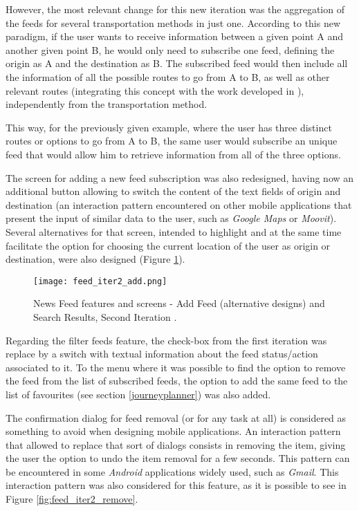 However, the most relevant change for this new iteration was the aggregation of the feeds for several transportation methods in just one. According to this new paradigm, if the user wants to receive information between a given point A and another given point B, he would only need to subscribe one feed, defining the origin as A and the destination as B. The subscribed feed would then include all the information of all the possible routes to go from A to B, as well as other relevant routes (integrating this concept with the work developed in \cite{kn:Dia13}), independently from the transportation method. 

This way, for the previously given example, where the user has three distinct routes or options to go from A to B, the same user would subscribe an unique feed that would allow him to retrieve information from all of the three options.

The screen for adding a new feed subscription was also redesigned, having now an additional button allowing to switch the content of the text fields of origin and destination (an interaction pattern encountered on other mobile applications that present the input of similar data to the user, such as \emph{Google Maps} or \emph{Moovit}).
Several alternatives for that screen, intended to highlight and at the same time facilitate the option for choosing the current location of the user as origin or destination, were also designed (Figure \ref{fig:feed_iter2_add}).

\begin{figure}[!h]
  \begin{center}
    \leavevmode
    \texttt{[image: feed\_iter2\_add.png]}
    \caption{News Feed features and screens - Add Feed (alternative designs) and Search Results, Second Iteration .}
    \label{fig:feed_iter2_add}
  \end{center}
\end{figure}


Regarding the filter feeds feature, the check-box from the first iteration was replace by a switch with textual information about the feed status/action associated to it.
To the menu where it was possible to find the option to remove the feed from the list of subscribed feeds, the option to add the same feed to the list of favourites (see section \ref{journeyplanner}) was also added. 

The confirmation dialog for feed removal (or for any task at all) is considered as something to avoid when designing mobile applications. An interaction pattern that allowed to replace that sort of dialogs consists in removing the item, giving the user the option to undo the item removal for a few seconds. This pattern can be encountered in some \emph{Android} applications widely used, such as \emph{Gmail}. This interaction pattern was also considered for this feature, as it is possible to see in Figure \ref{fig:feed_iter2_remove}.

